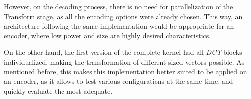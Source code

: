 However, on the decoding process, there is no need for parallelization of the Transform stage, as all the encoding options were already chosen. This way, an architecture following the same implementation would be appropriate for an encoder, where low power and size are highly desired characteristics.

On the other hand, the first version of the complete kernel had all \emph{DCT} blocks individualized, making the transformation of different sized vectors possible. As mentioned before, this makes this implementation better suited to be applied on an encoder, as it allows to test various configurations at the same time, and quickly evaluate the most adequate.




\clearpage
\printbibliography[heading=subbibliography]
